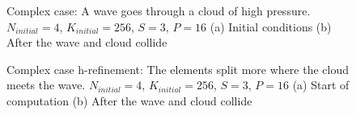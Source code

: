 \begin{figure}[H]
	\centering
	\hfill
	\caption{Complex case: A wave goes through a cloud of high pressure. \(N_{initial} = 4\), \(K_{initial} = 256\), \(S = 3\), \(P = 16\) (a) Initial conditions (b) After the wave and cloud collide}\label{fig:cloud_p}
\end{figure}

\begin{figure}[H]
	\centering
	\hfill
	\caption{Complex case h-refinement: The elements split more where the cloud meets the wave. \(N_{initial} = 4\), \(K_{initial} = 256\), \(S = 3\), \(P = 16\) (a) Start of computation (b) After the wave and cloud collide}\label{fig:cloud_s}
\end{figure}

